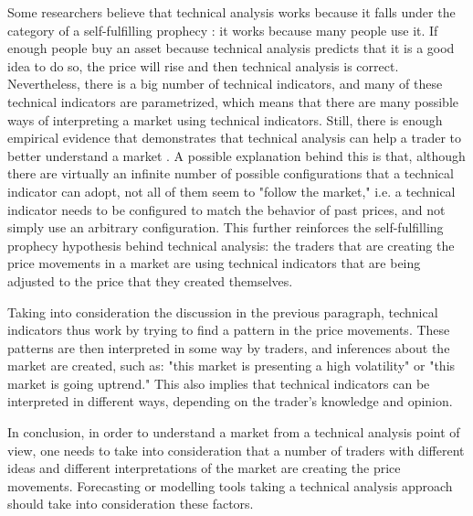 Some researchers believe that technical analysis works because it falls under
the category of a self-fulfilling prophecy \cite{Salganik2008}: it works
because many people use it. If enough people buy an asset because technical
analysis predicts that it is a good idea to do so, the price will rise and then
technical analysis is correct. Nevertheless, there is a big number of technical
indicators, and many of these technical indicators are parametrized, which means
that there are many possible ways of interpreting a market using technical
indicators. Still, there is enough empirical evidence that demonstrates that
technical analysis can help a trader to better understand a market
\cite{Achelis2000} \cite{Fund1992} \cite{Li1999}. 
A possible
explanation behind this is that, although there are virtually an infinite number
of possible configurations that a technical indicator can adopt, not all of them
seem to "follow the market," i.e. a technical indicator needs to be configured
to match the behavior of past prices, and not simply use an arbitrary
configuration. This further reinforces the self-fulfilling prophecy hypothesis
behind technical analysis: the traders that are creating the price movements in
a market are using technical indicators that are being adjusted to the price
that they created themselves.

Taking into consideration the discussion in the previous paragraph, technical
indicators thus work by trying to find a pattern in the price movements. These
patterns are then interpreted in some way by traders, and inferences about the
market are created, such as: "this market is presenting a high volatility" or
"this market is going uptrend." This also implies that technical indicators can
be interpreted in different ways, depending on the trader's knowledge and
opinion.

In conclusion, in order to understand a market from a technical analysis point
of view, one needs to take into consideration that a number of traders with
different ideas and different interpretations of the market are creating the
price movements. Forecasting or modelling tools taking a technical analysis
approach should take into consideration these factors. %


